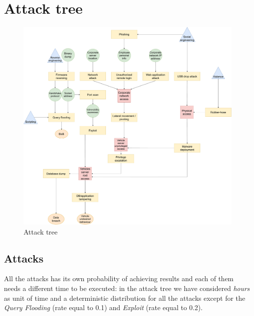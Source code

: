 %
\chapter{Attack tree}\label{ch:attackTree}


\begin{figure}[H]
    \begin{center}
        \includegraphics[scale=0.4]{img/attackTree.pdf}
        \caption{Attack tree}
        \label{fig:attackTree}
    \end{center}
    \vspace*{-0.4cm}
\end{figure}


\section{Attacks}
All the attacks has its own probability of achieving results and each of them needs a different time to be executed: in the attack tree we have considered \textit{hours} as unit of time and a deterministic distribution for all the attacks except for the \textit{Query Flooding} (rate equal to 0.1) and \textit{Exploit} (rate equal to 0.2).

